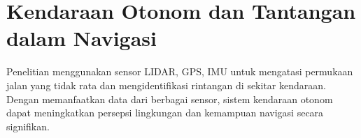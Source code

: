 

\setcounter{chapter}{2}
\setcounter{section}{0} %
\renewcommand{\thesection}{\thechapter.\arabic{section}}
\section{Kendaraan Otonom dan Tantangan dalam Navigasi
}
Penelitian \textcite{Ni2020-oa} menggunakan sensor LIDAR, GPS, IMU untuk mengatasi permukaan jalan yang tidak rata dan mengidentifikasi rintangan di sekitar kendaraan. Dengan memanfaatkan data dari berbagai sensor, sistem kendaraan otonom dapat meningkatkan persepsi lingkungan dan kemampuan navigasi secara signifikan.
